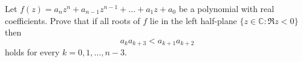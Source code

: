 \documentclass{article}
\begin{document}
\setlength{\parindent}{0pt}
Let $f(z)=a_{n}z^{n}+a_{n-1}z^{n-1}+\dots+a_{1}z+a_{0}$ be a polynomial with real coefficients. Prove that if all roots of $f$ lie in the left half-plane $\{z\in\mathbb{C}:\Re z<0\}$ then$$a_{k}a_{k+3}<a_{k+1}a_{k+2}$$holds for every $k=0,1,\dots,n-3$.
\end{document}
